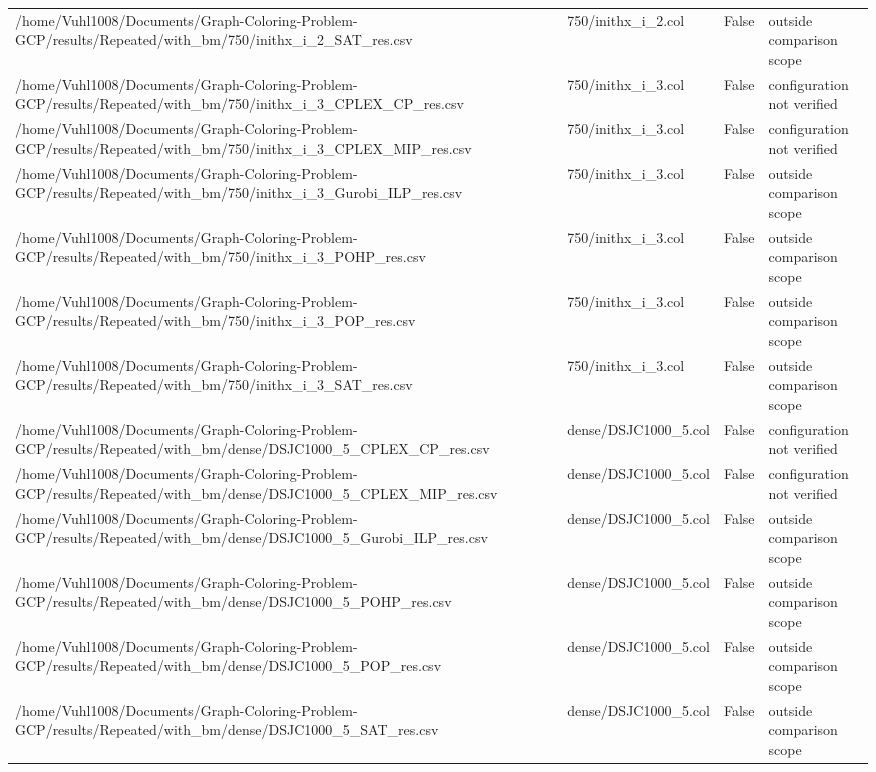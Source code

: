 \begin{table}[htbp]
\begin{tabular}{llll}
/home/Vuhl1008/Documents/Graph-Coloring-Problem-GCP/results/Repeated/with\_bm/750/inithx\_i\_2\_SAT\_res.csv & 750/inithx\_i\_2.col & False & outside comparison scope \\
/home/Vuhl1008/Documents/Graph-Coloring-Problem-GCP/results/Repeated/with\_bm/750/inithx\_i\_3\_CPLEX\_CP\_res.csv & 750/inithx\_i\_3.col & False & configuration not verified \\
/home/Vuhl1008/Documents/Graph-Coloring-Problem-GCP/results/Repeated/with\_bm/750/inithx\_i\_3\_CPLEX\_MIP\_res.csv & 750/inithx\_i\_3.col & False & configuration not verified \\
/home/Vuhl1008/Documents/Graph-Coloring-Problem-GCP/results/Repeated/with\_bm/750/inithx\_i\_3\_Gurobi\_ILP\_res.csv & 750/inithx\_i\_3.col & False & outside comparison scope \\
/home/Vuhl1008/Documents/Graph-Coloring-Problem-GCP/results/Repeated/with\_bm/750/inithx\_i\_3\_POHP\_res.csv & 750/inithx\_i\_3.col & False & outside comparison scope \\
/home/Vuhl1008/Documents/Graph-Coloring-Problem-GCP/results/Repeated/with\_bm/750/inithx\_i\_3\_POP\_res.csv & 750/inithx\_i\_3.col & False & outside comparison scope \\
/home/Vuhl1008/Documents/Graph-Coloring-Problem-GCP/results/Repeated/with\_bm/750/inithx\_i\_3\_SAT\_res.csv & 750/inithx\_i\_3.col & False & outside comparison scope \\
/home/Vuhl1008/Documents/Graph-Coloring-Problem-GCP/results/Repeated/with\_bm/dense/DSJC1000\_5\_CPLEX\_CP\_res.csv & dense/DSJC1000\_5.col & False & configuration not verified \\
/home/Vuhl1008/Documents/Graph-Coloring-Problem-GCP/results/Repeated/with\_bm/dense/DSJC1000\_5\_CPLEX\_MIP\_res.csv & dense/DSJC1000\_5.col & False & configuration not verified \\
/home/Vuhl1008/Documents/Graph-Coloring-Problem-GCP/results/Repeated/with\_bm/dense/DSJC1000\_5\_Gurobi\_ILP\_res.csv & dense/DSJC1000\_5.col & False & outside comparison scope \\
/home/Vuhl1008/Documents/Graph-Coloring-Problem-GCP/results/Repeated/with\_bm/dense/DSJC1000\_5\_POHP\_res.csv & dense/DSJC1000\_5.col & False & outside comparison scope \\
/home/Vuhl1008/Documents/Graph-Coloring-Problem-GCP/results/Repeated/with\_bm/dense/DSJC1000\_5\_POP\_res.csv & dense/DSJC1000\_5.col & False & outside comparison scope \\
/home/Vuhl1008/Documents/Graph-Coloring-Problem-GCP/results/Repeated/with\_bm/dense/DSJC1000\_5\_SAT\_res.csv & dense/DSJC1000\_5.col & False & outside comparison scope \\

\end{tabular}
\end{table}
